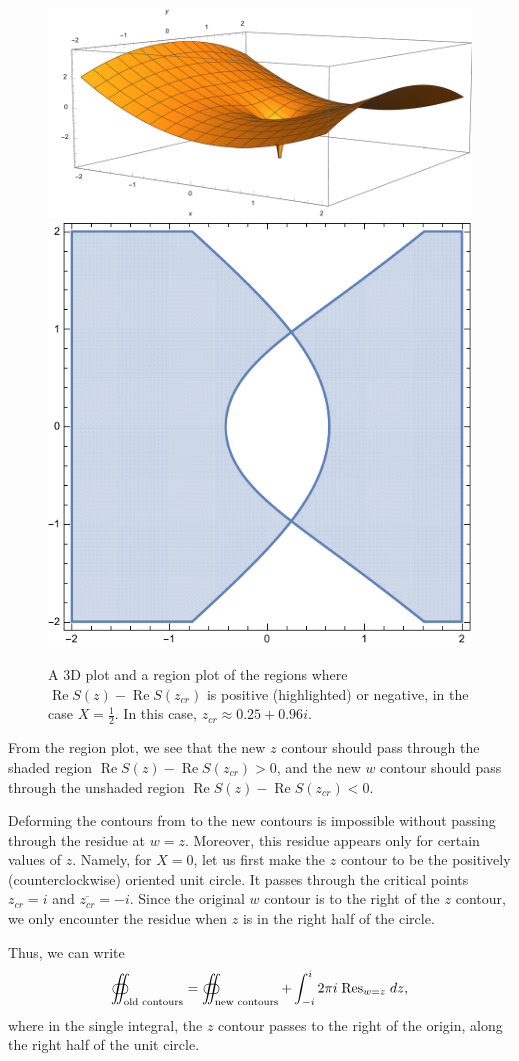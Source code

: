 \documentclass[letterpaper,11pt,oneside,reqno]{book}
\numberwithin{equation}{chapter}  %
\newcommand{\ssp}{\hspace{1pt}}
\theoremstyle{definition}
\begin{document}
\begin{figure}[htpb]
	\centering
	\includegraphics[height=.3\textwidth]{pictures/ReS_imaginary_3D.pdf}
	\qquad
	\includegraphics[height=.3\textwidth]{pictures/ReS_imaginary_region.pdf}
	\caption{A 3D plot and a region plot of the
	regions where $\operatorname{Re}S(z)-\operatorname{Re}S(z_{cr})$ is positive
	(highlighted) or negative, in the case $X=\frac{1}{2}$.
	In this case, $z_{cr}\approx 0.25+0.96 i$.}
	\label{lecture7:fig:ReS_imaginary}
\end{figure}

From the region plot, we see that the new $z$ contour should
pass through the shaded region $\operatorname{Re}S(z)-\operatorname{Re}S(z_{cr})>0$,
and the new $w$ contour should pass through the unshaded region
$\operatorname{Re}S(z)-\operatorname{Re}S(z_{cr})<0$.

Deforming the contours from  to the new contours
is impossible without passing through the residue at $w=z$.
Moreover, this residue appears only for certain values of $z$. Namely, for $X=0$,
let us first make the $z$ contour to be the positively (counterclockwise) oriented
unit circle.
It passes through the critical points $z_{cr}=i$ and $\overline{z_{cr}}=-i$.
Since the original $w$ contour is to the right of the $z$ contour, we only
encounter the residue when $z$ is in the right half of the circle.

Thus, we can write
\begin{equation}
	\label{lecture7:eq:K_n_bulk_deformation}
	\oiint_{\textnormal{old contours}}=
	\oiint_{\textnormal{new contours}}
	+
	\int_{-i}^i 2\pi i\ssp \operatorname{Res}\limits_{w=z}\ssp dz,
\end{equation}
where in the single integral, the $z$ contour passes to the right of the origin,
along the right half of the unit circle.
\end{document}
